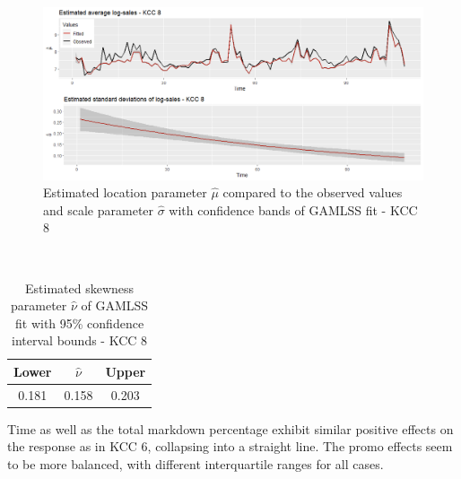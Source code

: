 \begin{figure}[H]
\centering
  \includegraphics[width=0.95\linewidth]{figures/gamlss_kcc_8_estimated_parameters.png}
  \caption{Estimated location parameter $\hat{\mu}$ compared to the observed values and scale parameter $\hat{\sigma}$ with confidence bands of GAMLSS fit - KCC 8}
  \label{fig:gamlss_kcc_8_estimated_parameters}
\end{figure}



\begin{table}[H]
\setlength\arrayrulewidth{1pt}  
\centering
\begin{adjustbox}{max width=\textwidth}\
\begin{tabular}{c|c|c}
\hline
\rowcolor{white} 
\textbf{Lower} & $\hat{\nu}$ & \textbf{Upper} \\ \hline\hline
0.181        & 0.158           & 0.203        \\ \hline
\end{tabular}
\end{adjustbox}
\caption{Estimated skewness parameter $\hat{\nu}$ of GAMLSS fit with 95\% confidence interval bounds - KCC 8}
\label{tab:nu_ci_kcc_8}
\end{table}



Time as well as the total markdown percentage exhibit similar positive effects on the response as in \ac{KCC} 6, collapsing into a straight line. The promo effects seem to be more balanced, with different interquartile ranges for all cases.
\\


